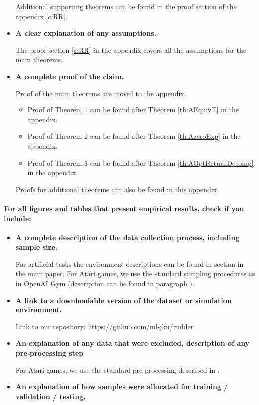 \documentclass{article}
\begin{document}
\begin{appendices}
\begin{itemize}
    Additional supporting theorems can be found in the proof section of the appendix \ref{c:RR}.
    \item \textbf{A clear explanation of any assumptions.}
    
The proof section \ref{c:RR} in the appendix covers all the assumptions for the main theorems.
    \item \textbf{A complete proof of the claim.}
    
Proof of the main theorems are moved to the appendix.
\begin{itemize}
    \item Proof of Theorem 1 can be found after Theorem \ref{th:AEquivT} in the appendix. 
    \item Proof of Theorem 2 can be found after Theorem \ref{th:AzeroExp} in the appendix. 
    \item Proof of Theorem 3 can be found after Theorem \ref{th:AOptReturnDecomp} in the appendix. 
\end{itemize}
Proofs for additional theorems can also be found in this appendix.
\end{itemize}

\paragraph{For all figures and tables that present empirical results, check if you include:}
\begin{itemize}
    \item \textbf{A complete description of the data collection process, including sample size.}
    
    For artificial tasks the environment descriptions can be found in section  in the main paper. For Atari games, we use the standard sampling procedures as in OpenAI Gym \cite{Brockman:16} (description can be found in paragraph ).
\item \textbf{A link to a downloadable version of the dataset or simulation environment.}
    
    Link to our repository:
    \href{https://github.com/ml-jku/baselines-rudder}{https://github.com/ml-jku/rudder}
    
    \item \textbf{An explanation of any data that were excluded, description of any pre-processing step}
    
    For Atari games, we use the standard pre-processing described in \cite{Mnih:16}.
    \item \textbf{An explanation of how samples were allocated for training / validation / testing.}
    

\end{itemize}
\end{appendices}
\end{document}
